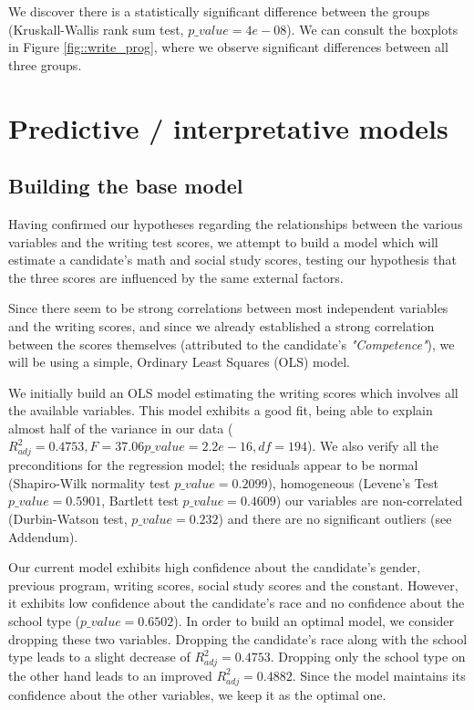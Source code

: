 \documentclass[10pt, a4paper]{article}
\begin{document}
	We discover there is a statistically significant difference between the groups (Kruskall-Wallis rank sum test, $p\_value=4e-08$). We can consult the boxplots in Figure \ref{fig::write_prog}, where we observe significant differences between all three groups.
	
	
	\section{Predictive / interpretative models}
	\label{sec::models}
	
	\subsection{Building the base model}
	Having confirmed our hypotheses regarding the relationships between the various variables and the writing test scores, we attempt to build a model which will estimate a candidate's math and social study scores, testing our hypothesis that the three scores are influenced by the same external factors. 
	
	Since there seem to be strong correlations between most independent variables and the writing scores, and since we already established a strong correlation between the scores themselves (attributed to the candidate's \textit{"Competence"}), we will be using a simple, Ordinary Least Squares (OLS) model.
	
	We initially build an OLS model estimating the writing scores which involves all the available variables. This model exhibits a good fit, being able to explain almost half of the variance in our data ($R^2_{adj} = 0.4753, F= 37.06 p\_value=2.2e-16, df=194$). We also verify all the preconditions for the regression model; the residuals appear to be normal (Shapiro-Wilk normality test $p\_value = 0.2099$), homogeneous (Levene's Test $p\_value = 0.5901$, Bartlett test $p\_value = 0.4609$) our variables are non-correlated (Durbin-Watson test, $p\_value=0.232$) and there are no significant outliers (see Addendum).
	
	Our current model exhibits high confidence about the candidate's gender, previous program, writing scores, social study scores and the constant. However, it exhibits low confidence about the candidate's race and no confidence about the school type ($p\_value=0.6502$). In order to build an optimal model, we consider dropping these two variables. Dropping the candidate's race along with the school type leads to a slight decrease of $R^2_{adj} = 0.4753$. Dropping only the school type on the other hand leads to an improved $R^2_{adj} = 0.4882$. Since the model maintains its confidence about the other variables, we keep it as the optimal one.
	
\end{document}
